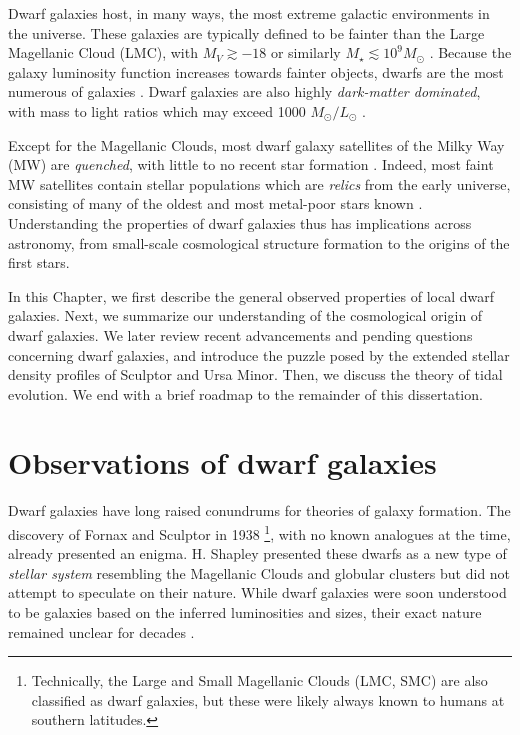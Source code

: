 Dwarf galaxies host, in many ways, the most extreme galactic
environments in the universe. These galaxies are typically defined to be
fainter than the Large Magellanic Cloud (LMC), with \(M_V \gtrsim -18\)
or similarly \(M_\star \lesssim 10^9 M_\odot\)
\citep[e.g.,][]{mcconnachie2012, bullock+boylan-kolchin2017}. Because
the galaxy luminosity function increases towards fainter objects, dwarfs
are the most numerous of galaxies
\citep[e.g.,][]{blanton+2005, mao+2021}. Dwarf galaxies are also highly
\emph{dark-matter dominated}, with mass to light ratios which may exceed
1000 \(M_\odot/ L_\odot\) \citep[implying \(\sim1000\) times more dark
matter than stellar mass, e.g.,][]{simon+geha2007, hayashi+2023}.

Except for the Magellanic Clouds, most dwarf galaxy satellites of the
Milky Way (MW) are \emph{quenched}, with little to no recent star
formation \citep[e.g.,][]{weisz+2014}. Indeed, most faint MW satellites
contain stellar populations which are \emph{relics} from the early
universe, consisting of many of the oldest and most metal-poor stars
known \citep{simon2019}. Understanding the properties of dwarf galaxies
thus has implications across astronomy, from small-scale cosmological
structure formation to the origins of the first stars.

In this Chapter, we first describe the general observed properties of
local dwarf galaxies. Next, we summarize our understanding of the
cosmological origin of dwarf galaxies. We later review recent
advancements and pending questions concerning dwarf galaxies, and
introduce the puzzle posed by the extended stellar density profiles of
Sculptor and Ursa Minor. Then, we discuss the theory of tidal evolution.
We end with a brief roadmap to the remainder of this dissertation.

\section{Observations of dwarf
galaxies}\label{observations-of-dwarf-galaxies}

Dwarf galaxies have long raised conundrums for theories of galaxy
formation. The discovery of Fornax and Sculptor in 1938
\citep{shapley1938}\footnote{Technically, the Large and Small Magellanic
  Clouds (LMC, SMC) are also classified as dwarf galaxies, but these
  were likely always known to humans at southern latitudes.}, with no
known analogues at the time, already presented an enigma. H. Shapley
presented these dwarfs as a new type of \emph{stellar system} resembling
the Magellanic Clouds and globular clusters but did not attempt to
speculate on their nature. While dwarf galaxies were soon understood to
be galaxies based on the inferred luminosities and sizes, their exact
nature remained unclear for decades
\citep[e.g.,][]{hodge1971, gallagher+wyse1994}.

